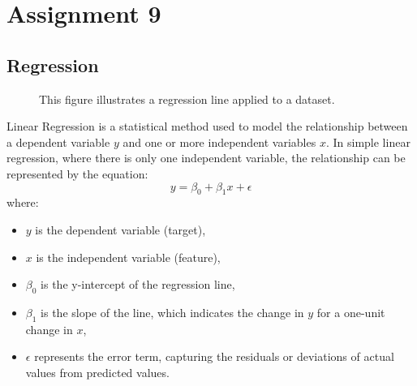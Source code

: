 \documentclass{article}
\begin{document}
\section{Assignment 9}
\subsection{Regression}
\begin{figure}[H]
\centering
{}
    \caption{This figure illustrates a regression line applied to a dataset. }
    \label{fig:regression_example}
\end{figure}
Linear Regression is a statistical method used to model the relationship between a dependent variable \( y \) and one or more independent variables \( x \). In simple linear regression, where there is only one independent variable, the relationship can be represented by the equation:
\[
y = \beta_0 + \beta_1 x + \epsilon
\]
where:
\begin{itemize}
    \item \( y \) is the dependent variable (target),
    \item \( x \) is the independent variable (feature),
    \item \( \beta_0 \) is the y-intercept of the regression line,
    \item \( \beta_1 \) is the slope of the line, which indicates the change in \( y \) for a one-unit change in \( x \),
    \item \( \epsilon \) represents the error term, capturing the residuals or deviations of actual values from predicted values.
\end{itemize}
\end{document}
